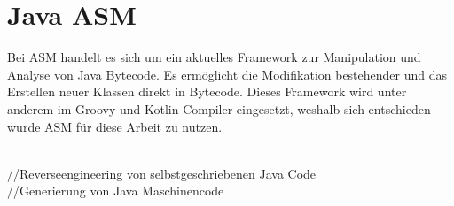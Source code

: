 \section{Java ASM}
Bei ASM handelt es sich um ein aktuelles Framework zur Manipulation und Analyse von Java Bytecode. Es ermöglicht die Modifikation bestehender und das Erstellen neuer Klassen direkt in Bytecode. Dieses Framework wird unter anderem im Groovy und Kotlin Compiler eingesetzt, weshalb sich entschieden wurde ASM für diese Arbeit zu nutzen.

\\
//Reverseengineering von selbstgeschriebenen Java Code
\\
//Generierung von Java Maschinencode
